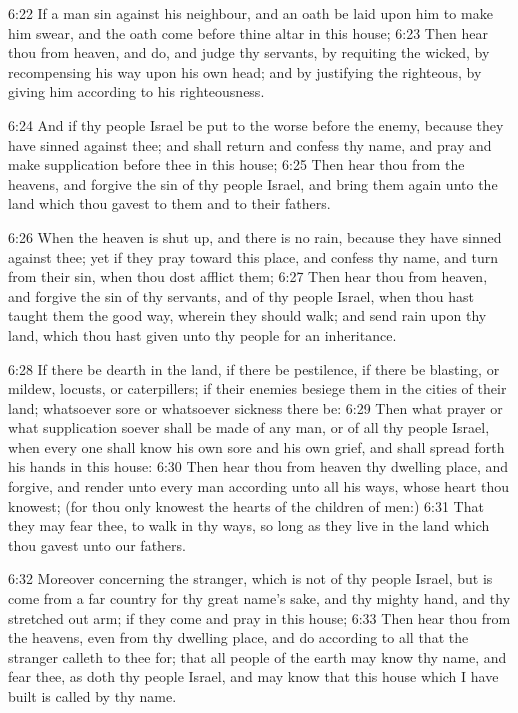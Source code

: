 6:22 If a man sin against his neighbour, and an oath be laid upon him
to make him swear, and the oath come before thine altar in this house;
6:23 Then hear thou from heaven, and do, and judge thy servants, by
requiting the wicked, by recompensing his way upon his own head; and
by justifying the righteous, by giving him according to his
righteousness.

6:24 And if thy people Israel be put to the worse before the enemy,
because they have sinned against thee; and shall return and confess
thy name, and pray and make supplication before thee in this house;
6:25 Then hear thou from the heavens, and forgive the sin of thy
people Israel, and bring them again unto the land which thou gavest to
them and to their fathers.

6:26 When the heaven is shut up, and there is no rain, because they
have sinned against thee; yet if they pray toward this place, and
confess thy name, and turn from their sin, when thou dost afflict
them; 6:27 Then hear thou from heaven, and forgive the sin of thy
servants, and of thy people Israel, when thou hast taught them the
good way, wherein they should walk; and send rain upon thy land, which
thou hast given unto thy people for an inheritance.

6:28 If there be dearth in the land, if there be pestilence, if there
be blasting, or mildew, locusts, or caterpillers; if their enemies
besiege them in the cities of their land; whatsoever sore or
whatsoever sickness there be: 6:29 Then what prayer or what
supplication soever shall be made of any man, or of all thy people
Israel, when every one shall know his own sore and his own grief, and
shall spread forth his hands in this house: 6:30 Then hear thou from
heaven thy dwelling place, and forgive, and render unto every man
according unto all his ways, whose heart thou knowest; (for thou only
knowest the hearts of the children of men:) 6:31 That they may fear
thee, to walk in thy ways, so long as they live in the land which thou
gavest unto our fathers.

6:32 Moreover concerning the stranger, which is not of thy people
Israel, but is come from a far country for thy great name's sake, and
thy mighty hand, and thy stretched out arm; if they come and pray in
this house; 6:33 Then hear thou from the heavens, even from thy
dwelling place, and do according to all that the stranger calleth to
thee for; that all people of the earth may know thy name, and fear
thee, as doth thy people Israel, and may know that this house which I
have built is called by thy name.


